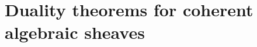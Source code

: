 \chapter{Duality theorems for coherent algebraic sheaves}\label{fga1}



\newpage


\newpage


\newpage


\newpage


\newpage


\newpage


\newpage


\newpage
